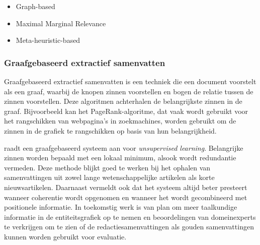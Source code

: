 \begin{itemize}
	\item Graph-based
	\item Maximal Marginal Relevance
	\item Meta-heuristic-based
\end{itemize}

\subsubsection{Graafgebaseerd extractief samenvatten}

Graafgebaseerd extractief samenvatten is een techniek die een document voorstelt als een graaf, waarbij de knopen zinnen voorstellen en bogen de relatie tussen de zinnen voorstellen. Deze algoritmen achterhalen de belangrijkste zinnen in de graaf. Bijvoorbeeld kan het PageRank-algoritme, dat vaak wordt gebruikt voor het rangschikken van webpagina's in zoekmachines, worden gebruikt om de zinnen in de grafiek te rangschikken op basis van hun belangrijkheid.

\textcite{Parveen2015} raadt een graafgebaseerd systeem aan voor \textit{unsupervised learning}. Belangrijke zinnen worden bepaald met een lokaal minimum, alsook wordt redundantie vermeden. Deze methode blijkt goed te werken bij het ophalen van samenvattingen uit zowel lange wetenschappelijke artikelen als korte nieuwsartikelen. Daarnaast vermeldt \textcite{Parveen2015} ook dat het systeem altijd beter presteert wanneer coherentie wordt opgenomen en wanneer het wordt gecombineerd met positionele informatie. In toekomstig werk is \textcite{Parveen2015} van plan om meer taalkundige informatie in de entiteitsgrafiek op te nemen en beoordelingen van domeinexperts te verkrijgen om te zien of de redactiesamenvattingen als gouden samenvattingen kunnen worden gebruikt voor evaluatie.

